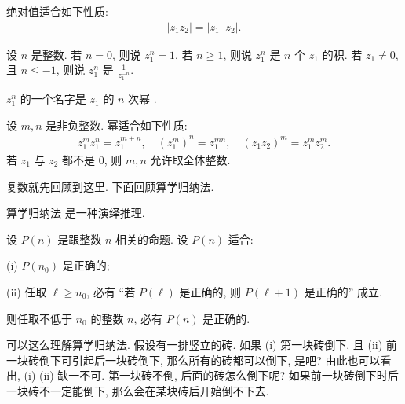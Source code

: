 \begin{proposition}
    绝对值适合如下性质:
    \begin{align*}
        |z_1 z_2| = |z_1| |z_2|.
    \end{align*}
\end{proposition}

\begin{definition}
    设 $n$ 是整数. 若 $n=0$, 则说 $z_1^n = 1$. 若 $n \geq 1$, 则说 $z_1^n$ 是 $n$ 个 $z_1$ 的积. 若 $z_1 \neq 0$, 且 $n \leq -1$, 则说 $z_1^n$ 是 $\frac{1}{z_1^{-n}}$.

    $z_1^n$ 的一个名字是 $z_1$ 的 $n$ 次幂 .
\end{definition}

\begin{proposition}
    设 $m,n$ 是非负整数. 幂适合如下性质:
    \begin{align*}
        z_1^m z_1^n = z_1^{m+n}, \quad (z_1^m)^n = z_1^{mn}, \quad (z_1 z_2)^m = z_1^m z_2^m.
    \end{align*}
    若 $z_1$ 与 $z_2$ 都不是 $0$, 则 $m,n$ 允许取全体整数.
\end{proposition}

复数就先回顾到这里. 下面回顾算学归纳法.

\begin{remark}
    算学归纳法  是一种演绎推理.
\end{remark}

\begin{proposition}
    设 $P(n)$ 是跟整数 $n$ 相关的命题. 设 $P(n)$ 适合:

    (i) $P(n_0)$ 是正确的;

    (ii) 任取 $\ell \geq n_0$, 必有 ``若 $P(\ell)$ 是正确的, 则 $P(\ell + 1)$ 是正确的'' 成立.

    则任取不低于 $n_0$ 的整数 $n$, 必有 $P(n)$ 是正确的.
\end{proposition}

\begin{remark}
    可以这么理解算学归纳法. 假设有一排竖立的砖. 如果 (i) 第一块砖倒下, 且 (ii) 前一块砖倒下可引起后一块砖倒下, 那么所有的砖都可以倒下, 是吧? 由此也可以看出, (i) (ii) 缺一不可. 第一块砖不倒, 后面的砖怎么倒下呢? 如果前一块砖倒下时后一块砖不一定能倒下, 那么会在某块砖后开始倒不下去.
\end{remark}

